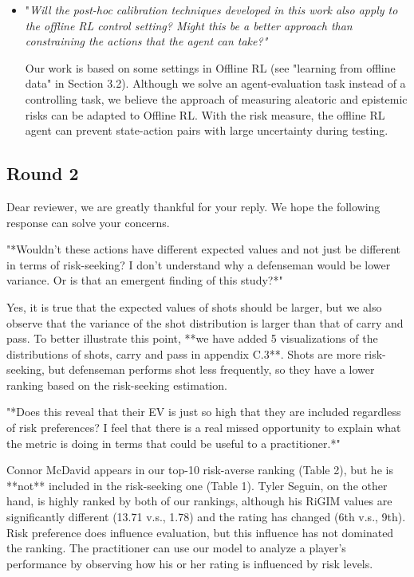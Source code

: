 \documentclass{article}
\begin{document}
\begin{itemize}
    \item "{\it Will the post-hoc calibration techniques developed in this work also apply to the offline RL control setting? Might this be a better approach than constraining the actions that the agent can take?"}
    
    Our work is based on some settings in Offline RL (see "learning from offline data" in Section 3.2). Although we solve an agent-evaluation task instead of a controlling task, we believe the approach of measuring aleatoric and epistemic risks can be adapted to Offline RL. With the risk measure, the offline RL agent can prevent state-action pairs with large uncertainty during testing.
    
\end{itemize}

\subsection{Round 2}

Dear reviewer, we are greatly thankful for your reply. We hope the following response can solve your concerns.

"*Wouldn't these actions have different expected values and not just be different in terms of risk-seeking? I don't understand why a defenseman would be lower variance. Or is that an emergent finding of this study?*"

Yes, it is true that the expected values of shots should be larger, but we also observe that the variance of the shot distribution is larger than that of carry and pass. To better illustrate this point, **we have added 5 visualizations of the distributions of shots, carry and pass in appendix C.3**. Shots are more risk-seeking, but defenseman performs shot less frequently, so they have a lower ranking based on the risk-seeking estimation.


"*Does this reveal that their EV is just so high that they are included regardless of risk preferences? I feel that there is a real missed opportunity to explain what the metric is doing in terms that could be useful to a practitioner.*"

Connor McDavid appears in our top-10 risk-averse ranking (Table 2), but he is **not** included in the risk-seeking one (Table 1). Tyler Seguin, on the other hand, is highly ranked by both of our rankings, although his RiGIM values are significantly different (13.71 v.s., 1.78) and the rating has changed (6th v.s., 9th). Risk preference does influence evaluation, but this influence has not dominated the ranking. The practitioner can use our model to analyze a player's performance by observing how his or her rating is influenced by risk levels. 
\end{document}
